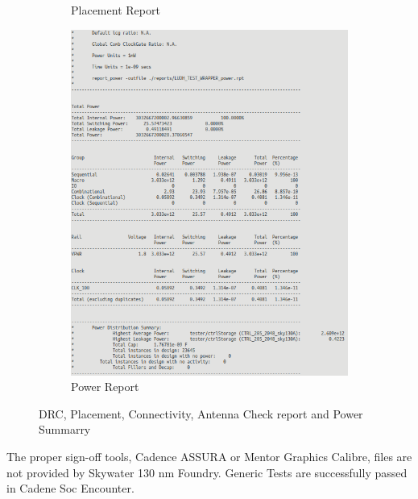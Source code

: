 \begin{figure}
\begin{subfigure}{.5\textwidth}
        \caption{Placement Report}
        \end{subfigure}  
      \begin{subfigure}{.5\textwidth}
        \centering
        \includegraphics[width=.9\linewidth]{./ASIC/POWER.png}
        \caption{Power Report}
        \end{subfigure}
    \caption{DRC, Placement, Connectivity, Antenna Check report and Power Summarry}
  \end{figure}


The proper sign-off tools, Cadence ASSURA or Mentor Graphics Calibre, files are not provided by Skywater 130 nm Foundry. Generic Tests are successfully passed in Cadene Soc Encounter.

